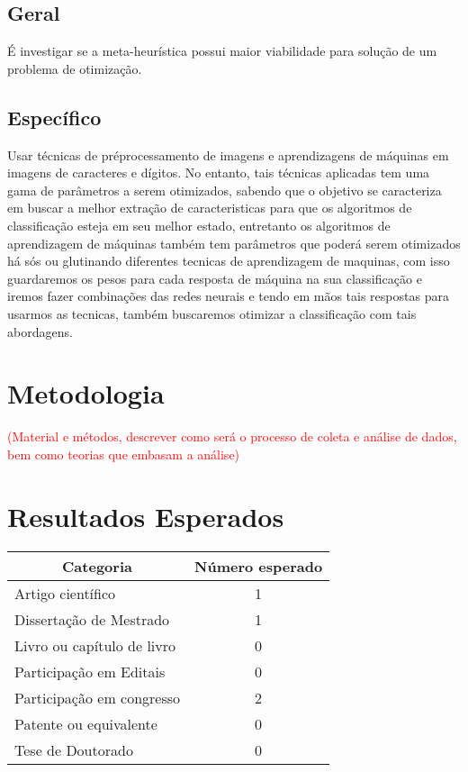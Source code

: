 \documentclass[12pt,a4paper,oneside]{book}
\newcommand\wb[1]{\discretionary{#1}{#1}{#1}}
\begin{document}
\section{Geral}
\'{E} investigar se a meta-heur\'{i}stica possui maior viabilidade para
solu\c{c}\~{a}o de um problema de otimiza\c{c}\~{a}o.
\section{Espec\'{i}fico}
Usar t\'{e}cnicas de pr\'{e}\wb-processamento de imagens e aprendizagens de
m\'{a}quinas em imagens de caracteres e d\'{i}gitos. No entanto, tais
t\'{e}cnicas aplicadas tem uma gama de par\^{a}metros a serem otimizados,
sabendo que o objetivo se caracteriza em buscar a melhor extra\c{c}\~{a}o de
caracteristicas para que os algoritmos de classifica\c{c}\~{a}o esteja em seu
melhor estado, entretanto os algoritmos de aprendizagem de m\'{a}quinas
tamb\'{e}m tem par\^{a}metros que poder\'{a} serem otimizados h\'{a} s\'{o}s ou
glutinando diferentes tecnicas de aprendizagem de maquinas, com isso guardaremos
os pesos para cada resposta de m\'{a}quina na sua classifica\c{c}\~{a}o e iremos
fazer combina\c{c}\~{o}es das redes neurais e tendo em m\~{a}os tais respostas
para usarmos as tecnicas, tamb\'{e}m buscaremos otimizar a classifica\c{c}\~{a}o
com tais abordagens.


\pagebreak

\chapter{Metodologia}
\textcolor{red}{(Material e m\'{e}todos, descrever como ser\'{a} o processo de
coleta e an\'{a}lise de dados, bem como teorias que embasam a an\'{a}lise)}
\pagebreak

\chapter{Resultados Esperados}
\begin{center}
    \begin{tabular}{|l|c|}
        \hline
        \multicolumn{1}{|c|}{Categoria} & \multicolumn{1}{|c|}{N\'{u}mero
        esperado} \\ \hline
        Artigo cient\'{i}fico & 1 \\ \hline
        Disserta\c{c}\~{a}o de Mestrado & 1 \\ \hline
        Livro ou cap\'{i}tulo de livro & 0 \\ \hline
        Participa\c{c}\~{a}o em Editais & 0 \\ \hline
        Participa\c{c}\~{a}o em congresso & 2 \\ \hline
        Patente ou equivalente & 0 \\ \hline
        Tese de Doutorado & 0 \\ \hline
    \end{tabular}
\end{center}
\pagebreak
\end{document}
